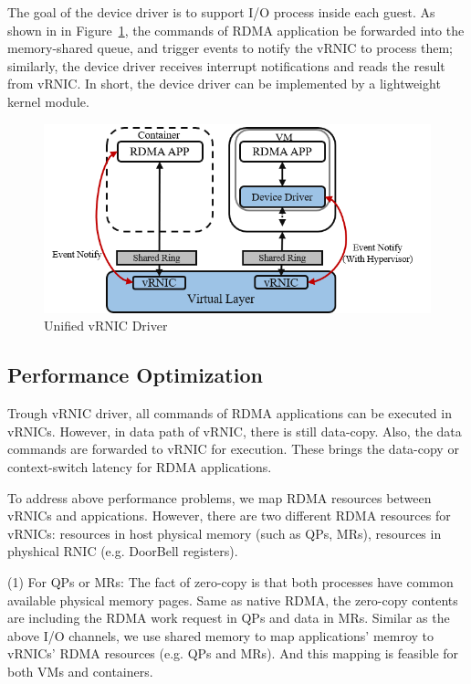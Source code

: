 The goal of the device driver is to support I/O process inside each guest. As shown in in Figure~\ref{fig:vrnic-driver},  the commands of RDMA application be forwarded into the memory-shared queue, and trigger events to notify the vRNIC to process them; similarly, the device driver receives interrupt notifications and reads the result from vRNIC. In short, the device driver can be implemented by a lightweight kernel module.

\begin{figure}[!ht]
\centering
\includegraphics[width=1.0\linewidth]{images/interface-general}
\caption{Unified vRNIC Driver}
\label{fig:vrnic-driver}
\end{figure}

	
\subsection{Performance Optimization}
Trough vRNIC driver, all commands of RDMA applications can be executed in vRNICs. However, in data path of vRNIC, there is still data-copy. Also, the data commands are forwarded to vRNIC for execution. These brings the data-copy or context-switch latency for RDMA applications. 

To address above performance problems, we map RDMA resources between vRNICs and appications. However, there are two different RDMA resources for vRNICs: resources in host physical memory (such as QPs, MRs), resources in physhical RNIC (e.g. DoorBell registers). 

(1) For QPs or MRs: The fact of zero-copy is that both processes have common available physical memory pages. Same as native RDMA, the zero-copy contents are including the RDMA work request in QPs and data in MRs. 
Similar as the above I/O channels, we use shared memory to map applications' memroy to vRNICs' RDMA resources (e.g. QPs and MRs). And this mapping is feasible for both VMs and containers.


